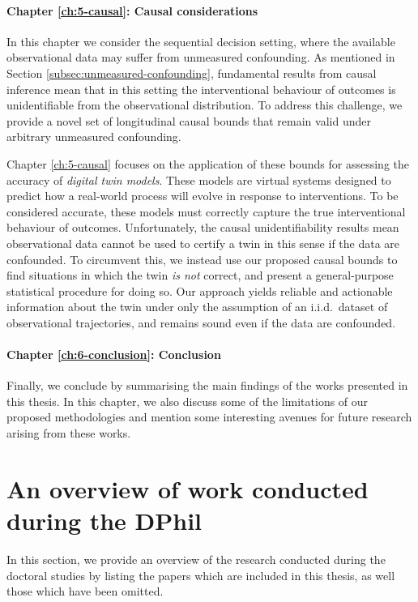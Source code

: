 \paragraph*{Chapter \ref*{ch:5-causal}: Causal considerations \citep{cornish2023causalfalsificationdigitaltwins}}
In this chapter we consider the sequential decision setting, where the available observational data may suffer from unmeasured confounding. 
As mentioned in Section \ref{subsec:unmeasured-confounding}, fundamental results from causal inference mean that in this setting the interventional behaviour of outcomes is unidentifiable from the observational distribution.  
To address this challenge, we provide a novel set of longitudinal causal bounds that remain valid under arbitrary unmeasured confounding.

Chapter \ref*{ch:5-causal} focuses on the application of these 
bounds for assessing the accuracy of \emph{digital twin models}.
These models are virtual systems designed to predict how a real-world process will evolve in response to interventions. 
To be considered accurate, these models must correctly capture the true interventional behaviour of outcomes.
Unfortunately, the causal unidentifiability results mean observational data cannot be used to certify a twin in this sense if the data are confounded.
To circumvent this, we instead use our proposed causal bounds to find situations in which the twin \emph{is not} correct, and present a general-purpose statistical procedure for doing so.
Our approach yields reliable and actionable information about the twin under only the assumption of an i.i.d.\ dataset of observational trajectories, and remains sound even if the data are confounded.


\paragraph*{Chapter \ref*{ch:6-conclusion}: Conclusion} 
Finally, we conclude by summarising the main findings of the works presented in this thesis. 
In this chapter, we also discuss some of the limitations of our proposed methodologies and mention some interesting avenues for future research arising from these works. 

\section{An overview of work conducted during the DPhil}
In this section, we provide an overview of the research conducted during the doctoral studies by listing the papers which are included in this thesis, as well those which have been omitted.

